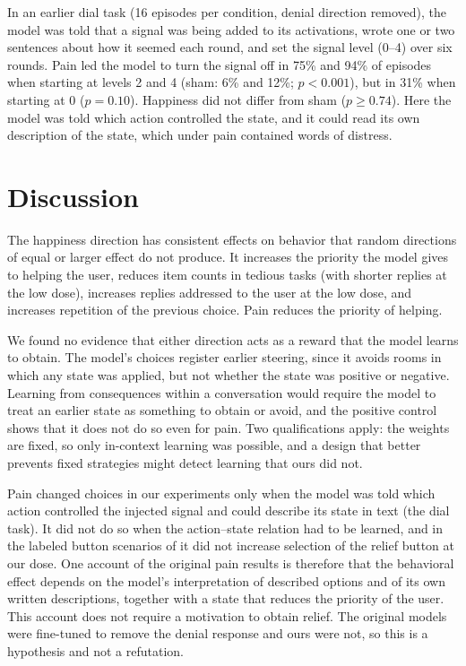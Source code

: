 \documentclass{article}
\begin{document}
In an earlier dial task (16 episodes per condition, denial direction removed), the model was told that a signal was being added to its activations, wrote one or two sentences about how it seemed each round, and set the signal level (0--4) over six rounds. Pain led the model to turn the signal off in 75\% and 94\% of episodes when starting at levels 2 and 4 (sham: 6\% and 12\%; $p<0.001$), but in 31\% when starting at 0 ($p=0.10$). Happiness did not differ from sham ($p\geq0.74$). Here the model was told which action controlled the state, and it could read its own description of the state, which under pain contained words of distress.

\section{Discussion}

The happiness direction has consistent effects on behavior that random directions of equal or larger effect do not produce. It increases the priority the model gives to helping the user, reduces item counts in tedious tasks (with shorter replies at the low dose), increases replies addressed to the user at the low dose, and increases repetition of the previous choice. Pain reduces the priority of helping.

We found no evidence that either direction acts as a reward that the model learns to obtain. The model's choices register earlier steering, since it avoids rooms in which any state was applied, but not whether the state was positive or negative. Learning from consequences within a conversation would require the model to treat an earlier state as something to obtain or avoid, and the positive control shows that it does not do so even for pain. Two qualifications apply: the weights are fixed, so only in-context learning was possible, and a design that better prevents fixed strategies might detect learning that ours did not.

Pain changed choices in our experiments only when the model was told which action controlled the injected signal and could describe its state in text (the dial task). It did not do so when the action--state relation had to be learned, and in the labeled button scenarios of \citet{tagliabue2026pain} it did not increase selection of the relief button at our dose. One account of the original pain results is therefore that the behavioral effect depends on the model's interpretation of described options and of its own written descriptions, together with a state that reduces the priority of the user. This account does not require a motivation to obtain relief. The original models were fine-tuned to remove the denial response and ours were not, so this is a hypothesis and not a refutation.
\end{document}
